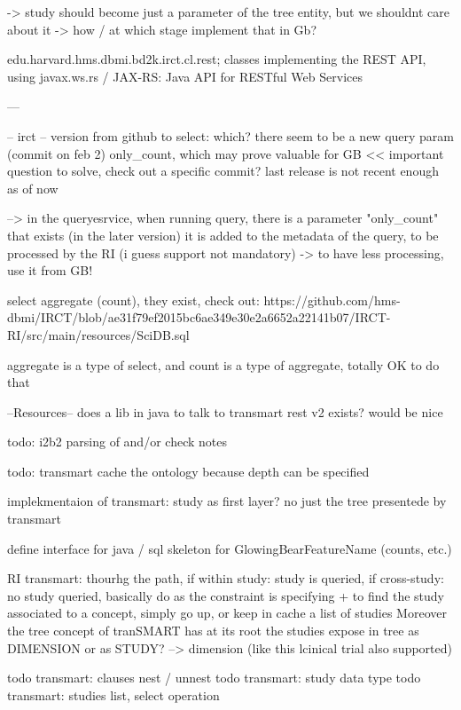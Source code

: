 -> study should become just a parameter of the tree entity, but we shouldnt care about it
-> how / at which stage implement that in Gb?

edu.harvard.hms.dbmi.bd2k.irct.cl.rest;
classes implementing the REST API, using javax.ws.rs / JAX-RS: Java API for RESTful Web Services

---

-- irct --
version from github to select: which? there seem to be a new query param (commit on feb 2) only\_count, which may prove valuable for GB << important question to solve, check out a specific commit? last release is not recent enough as of now 

--> in the queryesrvice, when running query, there is a parameter "only\_count" that exists (in the later version)
it is added to the metadata of the query, to be processed by the RI (i guess support not mandatory) 
-> to have less processing, use it from GB!

select aggregate (count), they exist, check out: https://github.com/hms-dbmi/IRCT/blob/ae31f79ef2015bc6ae349e30e2a6652a22141b07/IRCT-RI/src/main/resources/SciDB.sql

aggregate is a type of select, and count is a type of aggregate, totally OK to do that 



--Resources--
does a lib in java to talk to transmart rest v2 exists? would be nice

todo: i2b2 parsing of and/or check notes

todo: transmart cache the ontology because depth can be specified

implekmentaion of transmart: study as first layer? no just the tree presentede by transmart

define interface for java / sql skeleton for GlowingBearFeatureName (counts, etc.)


RI transmart: thourhg the path, if within study: study is queried, if cross-study: no study queried, basically do as the constraint is specifying
+ to find the study associated to a concept, simply go up, or keep in cache a list of studies
Moreover the tree concept of tranSMART has at its root the studies
expose in tree as DIMENSION or as STUDY? --> dimension (like this lcinical trial also supported)

todo transmart: clauses nest / unnest
todo transmart: study data type
todo transmart: studies list, select operation



